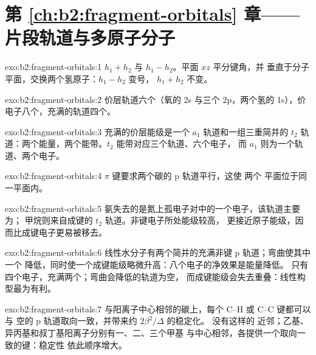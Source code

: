 \section*{第 \ref{ch:b2:fragment-orbitals} 章——片段轨道与多原子分子}

\begin{solution}{exo:b2:fragment-orbitals:1}
$h_1 + h_2$ 与 $h_1 - h_2$。平面 $xz$ 平分键角，并
垂直于分子平面，交换两个氢原子：$h_1 - h_2$ 变号，
$h_1 + h_2$ 不变。
\end{solution}

\begin{solution}{exo:b2:fragment-orbitals:2}
价层轨道六个（氧的 2s 与三个 2p，两个氢的 1s），价
电子八个，充满的轨道四个。
\end{solution}

\begin{solution}{exo:b2:fragment-orbitals:3}
充满的价层能级是一个 $a_1$ 轨道和一组三重简并的 $t_2$
轨道：两个能量，两个能带。$t_2$ 能带对应三个轨道、六个电子，
而 $a_1$ 则为一个轨道、两个电子。
\end{solution}

\begin{solution}{exo:b2:fragment-orbitals:4}
$\pi$ 键要求两个碳的 p 轨道平行，这使
两个  平面位于同一平面内。
\end{solution}

\begin{solution}{exo:b2:fragment-orbitals:5}
氨失去的是氮上孤电子对中的一个电子，该轨道主要为；
甲烷则来自成键的 $t_2$ 轨道。非键电子所处能级较高，
更接近原子能级，因而比成键电子更易被移去。
\end{solution}

\begin{solution}{exo:b2:fragment-orbitals:6}
线性水分子有两个简并的充满非键 p 轨道；弯曲使其中一个
降低，同时使一个成键能级略微升高：八个电子的净效果是能量降低。
只有四个电子，充满两个；弯曲会降低的轨道为空，
而成键能级会失去重叠：线性构型最为有利。
\end{solution}

\begin{solution}{exo:b2:fragment-orbitals:7}
与阳离子中心相邻的碳上，每个 C--H 或 C--C 键都可以与
空的 p 轨道取向一致，并带来约 $2\beta^2/\Delta$ 的稳定化。 没有这样的
近邻；乙基、异丙基和叔丁基阳离子分别有一、二、三个甲基
与中心相邻，各提供一个取向一致的键：稳定性
依此顺序增大。
\end{solution}

